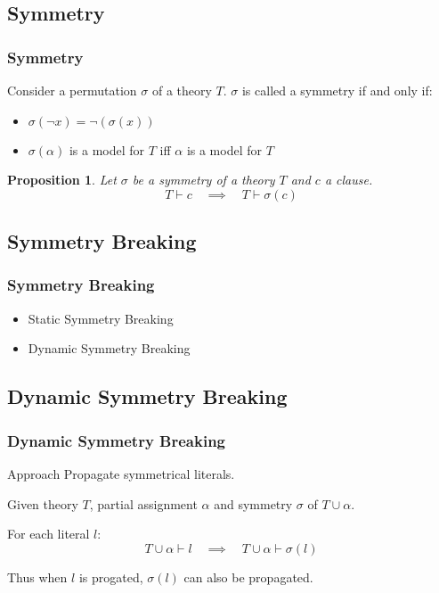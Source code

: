\documentclass{beamer}
\newtheorem{proposition}{Proposition}
\begin{document}
	\subsection{Symmetry}
	\begin{frame}
		\frametitle{Symmetry}

		\begin{definition}[Symmetry]
			Consider a permutation $\sigma$ of a theory $T$. $\sigma$ is called a symmetry if and only if:
			\begin{itemize}
				\item $\sigma(\neg x) = \neg(\sigma(x))$
				\item $\sigma(\alpha)$ is a model for $T$ iff $\alpha$ is a model for $T$
			\end{itemize}
		\end{definition}

		\pause

		\begin{proposition}
			Let $\sigma$ be a symmetry of a theory $T$ and $c$ a clause.
			\begin{equation}
				T \vdash c \quad \implies \quad T \vdash \sigma( c )
			\end{equation}
		\end{proposition}
	\end{frame}

	\subsection{Symmetry Breaking}
	\begin{frame}
		\frametitle{Symmetry Breaking}

		\begin{itemize}
			\item Static Symmetry Breaking
			\item Dynamic Symmetry Breaking
		\end{itemize}
	\end{frame}

	\subsection{Dynamic Symmetry Breaking}
	\begin{frame}
		\frametitle{Dynamic Symmetry Breaking}

		\begin{block}{Approach}
			Propagate symmetrical literals.

			Given theory $T$, partial assignment $\alpha$ and symmetry
			\alert<2->{$\sigma$ of $T \cup \alpha$}.

			For each literal $l$:
			\begin{equation}
				T \cup \alpha \vdash l \quad
				\implies
				\quad T \cup \alpha \vdash \sigma(l)
			\end{equation}

			Thus when $l$ is progated, $\sigma(l)$ can also be propagated.
		\end{block}
	\end{frame}
\end{document}

